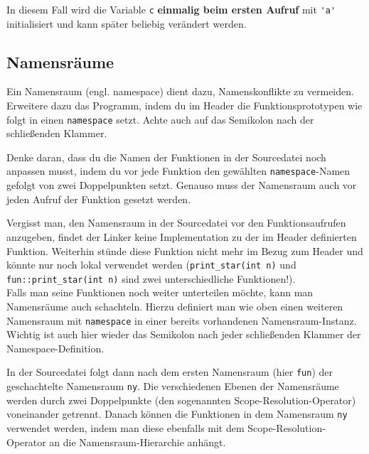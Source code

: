 
In diesem Fall wird die Variable \lstinline{c} \textbf{einmalig beim ersten Aufruf} mit \lstinline{'a'} initialisiert und kann später beliebig verändert werden.


\subsection{Namensräume}
Ein Namensraum (engl. namespace) dient dazu, Namenskonflikte zu vermeiden.
Erweitere dazu das Programm, indem du im Header die Funktionsprototypen wie
folgt in einen \lstinline{namespace} setzt. Achte auch auf das Semikolon nach der schließenden Klammer.


Denke daran, dass du die Namen der Funktionen in der Sourcedatei noch anpassen musst, indem du vor jede Funktion den gewählten \lstinline{namespace}-Namen gefolgt von zwei Doppelpunkten setzt.
Genauso muss der Namensraum auch vor jeden Aufruf der Funktion gesetzt werden.


Vergisst man, den Namensraum in der Sourcedatei vor den Funktionsaufrufen anzugeben, findet der Linker keine Implementation zu der im Header definierten Funktion.
Weiterhin stünde diese Funktion nicht mehr im Bezug zum Header und könnte nur noch lokal verwendet werden (\lstinline{print_star(int n)} und \lstinline{fun::print_star(int n)} sind zwei unterschiedliche Funktionen!). \\

Falls man seine Funktionen noch weiter unterteilen möchte, kann man Namensräume auch schachteln.
Hierzu definiert man wie oben einen weiteren Namensraum mit \lstinline{namespace} in einer bereits vorhandenen Namensraum-Instanz. Wichtig ist auch hier wieder das Semikolon nach jeder schließenden Klammer der Namespace-Definition.


In der Sourcedatei folgt dann nach dem ersten Namensraum (hier \lstinline{fun}) der geschachtelte Namensraum \lstinline{ny}. Die verschiedenen Ebenen der Namensräume werden durch zwei Doppelpunkte (den sogenannten Scope-Resolution-Operator) voneinander getrennt.
Danach können die Funktionen in dem Namensraum \lstinline{ny} verwendet werden, indem man diese ebenfalls mit dem Scope-Resolution-Operator an die Namensraum-Hierarchie anhängt.


